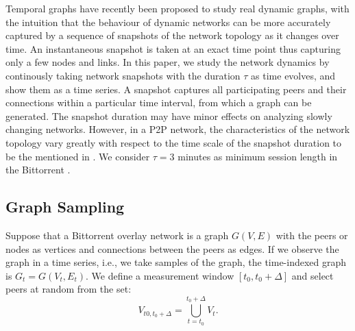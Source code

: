 \documentclass[10pt,conference,letterpaper]{IEEEtran}
\begin{document}
Temporal graphs have recently been proposed to study real dynamic graphs, with the intuition that the behaviour of dynamic networks can be more accurately captured by a sequence of snapshots of the network topology as it changes over time.
An instantaneous snapshot is taken at an exact time point thus capturing only a few nodes and links.
In this paper, we study the network dynamics by continously taking network snapshots with the duration $\tau$ as time evolves, and show them as a time series.
A snapshot captures all participating peers and their connections within a particular time interval, from which a graph can be generated.
The snapshot duration may have minor effects on analyzing slowly changing networks.
However, in a P2P network, the characteristics of the network topology vary greatly with respect to the time scale of the snapshot duration to be the mentioned in \cite{stutzbach2008characterizing}.
We consider $\tau=3 $ minutes as minimum session length in the Bittorrent \cite{stutzbach2006understanding}. 

\subsection{Graph Sampling}

Suppose that a Bittorrent overlay network is a graph $G(V,E)$ with the peers or nodes as vertices and connections between the peers as edges. 
If we observe the graph in a time series,  i.e., we take samples of the graph, the time-indexed graph is $G_t = G(V_t,E_t)$.   
We define a measurement window $[t_0,t_0 + \Delta]$ and select peers at random from the set:
 \begin{equation}
V_{t0,t_0+\Delta} = \bigcup_{t=t_0}^{t_0+\Delta} V_t.
 \label{eq:samplingvertices}
 \end{equation}
\end{document}
